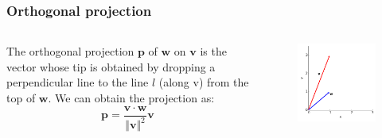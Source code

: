 \documentclass{beamer}
\begin{document}
\begin{frame}
\frametitle{Orthogonal projection}
\begin{columns}[c]
The orthogonal projection $\mathbf{p} $ of $\mathbf{w}$ on $\mathbf{v}$  is the vector whose tip is obtained by dropping a perpendicular line to the line $l$ (along v) from the top of $\mathbf{w}$. We can obtain the projection as:
$$  \mathbf{p} =\frac{ \mathbf{v} \cdot  \mathbf{w}}{\Vert \mathbf{v} \Vert^2}  \mathbf{v} $$

\begin{figure}[htbp]
\begin{center}
 \includegraphics[width=\textwidth]{figure4a.png}
\caption{}
\end{center}
\end{figure}
\end{columns}
\end{frame}
\end{document}
